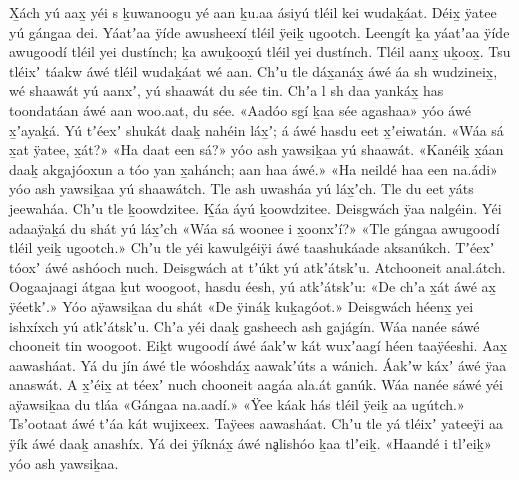 \begin{pairs}
\begin{Leftside}
\beginnumbering
\setcounter{pstartL}{12}
\pstart
\noindent
{}X̱ách yú aax̱ yéi s ḵuwanoogu yé aan ḵu.aa ásiyú tléil kei wudaḵáat.
Déix̱ ÿatee yú gáng̱aa dei.
Yáatʼaa ÿíde awusheexí tléil ÿeiḵ ugootch.
Leengít ḵa yáatʼaa ÿíde awugoodí tléil yei dustínch;
ḵa awuḵoox̱ú tléil yei dustínch.
Tléil aanx̱ uḵoox̱.
Tsu tléixʼ táakw áwé tléil wudaḵáat wé aan.
Chʼu tle dáx̱anáx̱ áwé áa sh wudzineix̱, wé shaawát yú aanxʼ, yú shaawát du sée tin.
Chʼa l sh daa yankáx̱ has toondatáan áwé aan woo.aat, du sée.
«\!Aadóo sgí ḵaa sée ag̱ashaa\!» yóo áwé x̱ʼayaḵá.
Yú tʼéexʼ shukát daaḵ nahéin láx̱ʼ;
á áwé hasdu eet x̱ʼeiwatán.
«\!Wáa sá x̱at ÿatee, x̱át?\!»
«\!Ha daat een sá?\!» yóo ash yawsiḵaa yú shaawát.
«\!Kanéiḵ x̱áan daaḵ akg̱ajóoxun a tóo yan x̱ahánch;
aan haa áwé.\!»
«\!Ha neildé haa een na.ádi\!»
yóo ash yawsiḵaa yú shaawátch.
Tle ash uwasháa yú láx̱ʼch.
Tle du eet yáts jeewaháa.
Chʼu tle ḵoowdzitee.
Ḵáa áyú ḵoowdzitee.
Deisgwách ÿaa nalgéin.
Yéi adaaÿaḵá du shát yú láx̱ʼch
«\!Wáa sá woonee i x̱oonxʼí?\!»
«\!Tle gáng̱aa awugoodí tléil yeiḵ ugootch.\!»
\pend
\pstart
{}Chʼu tle yéi kawulgéiÿi áwé taashukáade aksanúkch.
Tʼéexʼ tóoxʼ áwé ashóoch nuch.
Deisgwách at tʼúkt yú atkʼátskʼu.
At\-choo\-n\-eit anal.átch.
Oog̱aajaag̱i átg̱aa ḵut woogoot, hasdu éesh, yú atkʼátskʼu:
«\!De chʼa x̱át áwé ax̱ ÿéetkʼ.\!»
Yóo aÿawsiḵaa du shát
«\!De ÿináḵ kuḵagóot.\!»
Deisgwách héenx̱ yei ishxíxch yú atkʼátskʼu.
Chʼa yéi daaḵ g̱asheech ash g̱ajág̱ín.
\pend
\pstart
{}Wáa nanée sáwé chooneit tin woogoot.
Eiḵt wugoodí áwé áakʼw kát wuxʼaagí héen taaÿéeshi.
Aax̱ aawasháat.
Yá du jín áwé tle wóoshdáx̱ aawakʼúts a wánich.
Áakʼw káxʼ áwé ÿaa anaswát.
A x̱ʼéix̱ at téexʼ nuch chooneit aag̱áa ala.át g̱anúk.
\pend
\pstart
{}Wáa nanée sáwé yéi aÿawsiḵaa du tláa
«\!Gáng̱aa na.aadí.\!»
«\!Ÿee káak hás tléil ÿeiḵ aa ugútch.\!»
Tsʼootaat áwé tʼáa kát wujixeex.
Taÿees aawasháat.
Chʼu tle yá tléixʼ yateeÿi aa ÿík áwé daaḵ anashíx.
Yá dei ÿíknáx̱ áwé nḁlishóo ḵaa tlʼeiḵ.
«\!Haan\-dé i tlʼeiḵ\!»
yóo ash yawsiḵaa.

\end{Leftside}
\end{pairs}
